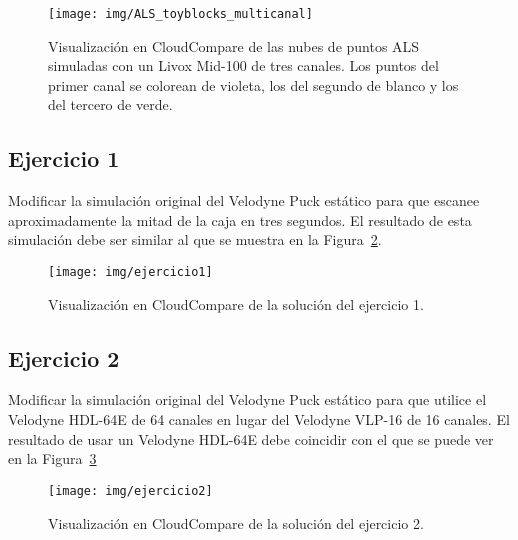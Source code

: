 \documentclass[]{article}
\begin{document}
	
	\begin{figure}[H]
		\centering
		\texttt{[image: img/ALS\_toyblocks\_multicanal]}
		\caption{Visualización en CloudCompare de las nubes de puntos ALS simuladas con un Livox Mid-100 de tres canales. Los puntos del primer canal se colorean de violeta, los del segundo de blanco y los del tercero de verde.}
		\label{fig:als_toyblocks_multicanal}
	\end{figure}




	\pagebreak
	

	\subsection*{Ejercicio 1}
	Modificar la simulación original del Velodyne Puck estático para que escanee aproximadamente la mitad de la caja en tres segundos. El resultado de esta simulación debe ser similar al que se muestra en la Figura~\ref{fig:ejercicio1}.
	
	\begin{figure}[htb]
		\centering
		\texttt{[image: img/ejercicio1]}
		\caption{Visualización en CloudCompare de la solución del ejercicio 1.}
		\label{fig:ejercicio1}
	\end{figure}


	\subsection*{Ejercicio 2}
	Modificar la simulación original del Velodyne Puck estático para que utilice el Velodyne HDL-64E de 64 canales en lugar del Velodyne VLP-16 de 16 canales. El resultado de usar un Velodyne HDL-64E debe coincidir con el que se puede ver en la Figura~\ref{fig:ejercicio2}
	
	\begin{figure}[htb]
		\centering
		\texttt{[image: img/ejercicio2]}
		\caption{Visualización en CloudCompare de la solución del ejercicio 2.}
		\label{fig:ejercicio2}
	\end{figure}


	\pagebreak
	
\end{document}
